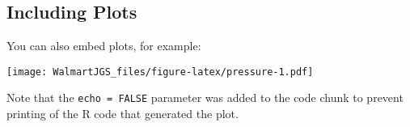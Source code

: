 \documentclass[]{article}
\begin{document}
\hypertarget{including-plots}{%
\subsection{Including Plots}\label{including-plots}}

You can also embed plots, for example:

\texttt{[image: WalmartJGS\_files/figure-latex/pressure-1.pdf]}

Note that the \texttt{echo\ =\ FALSE} parameter was added to the code
chunk to prevent printing of the R code that generated the plot.
\end{document}
